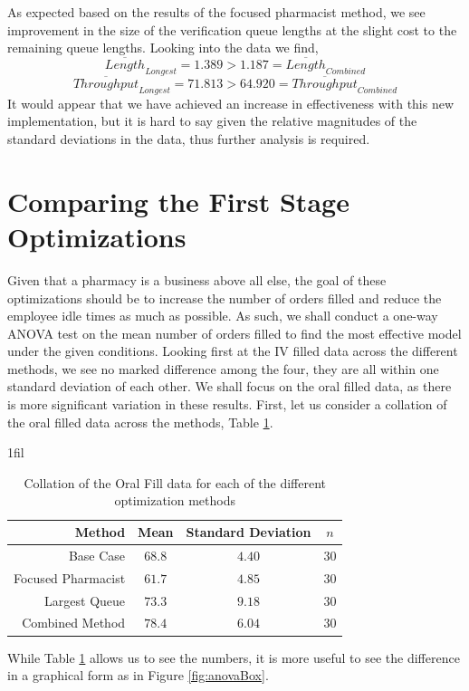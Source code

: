 \documentclass[10pt]{report}            %
\makeatletter
\newcommand*{\centerfloat}{%
  \parindent \z@
  \leftskip \z@ \@plus 1fil \@minus \textwidth
  \rightskip\leftskip
  \parfillskip \z@skip}
\makeatother
\begin{document}
As expected based on the results of the focused pharmacist method, we see improvement in the size of the verification queue lengths at the slight cost to the remaining queue lengths. Looking into the data we find,
\[\overline{Length}_{Longest}=1.389 > 1.187 = \overline{Length}_{Combined}\]
\[\overline{Throughput}_{Longest}=71.813 > 64.920 = \overline{Throughput}_{Combined}\]
It would appear that we have achieved an increase in effectiveness with this new implementation, but it is hard to say given the relative magnitudes of the standard deviations in the data, thus further analysis is required.
\section*{Comparing the First Stage Optimizations}
Given that a pharmacy is a business above all else, the goal of these optimizations should be to increase the number of orders filled and reduce the employee idle times as much as possible. As such, we shall conduct a one-way ANOVA test on the mean number of orders filled to find the most effective model under the given conditions. Looking first at the IV filled data across the different methods, we see no marked difference among the four, they are all within one standard deviation of each other. We shall focus on the oral filled data, as there is more significant variation in these results. First, let us consider a collation of the oral filled data across the methods, Table \ref{table:collate}.
\begin{table}[H]
\centerfloat
\begin{tabular}{|r||c|c|c|}
\hline
Method & Mean & Standard Deviation & $n$\\\hline\hline
Base Case & $68.8$ & $4.40$ & $30$\\\hline
Focused Pharmacist & $61.7$ & $4.85$ & $30$\\\hline
Largest Queue & $73.3$ & $9.18$ & $30$\\\hline
Combined Method & $78.4$ & $6.04$ & $30$\\\hline
\end{tabular}
\caption{Collation of the Oral Fill data for each of the different optimization methods}
\label{table:collate}
\end{table}
While Table \ref{table:collate} allows us to see the numbers, it is more useful to see the difference in a graphical form as in Figure \ref{fig:anovaBox}.
\end{document}

